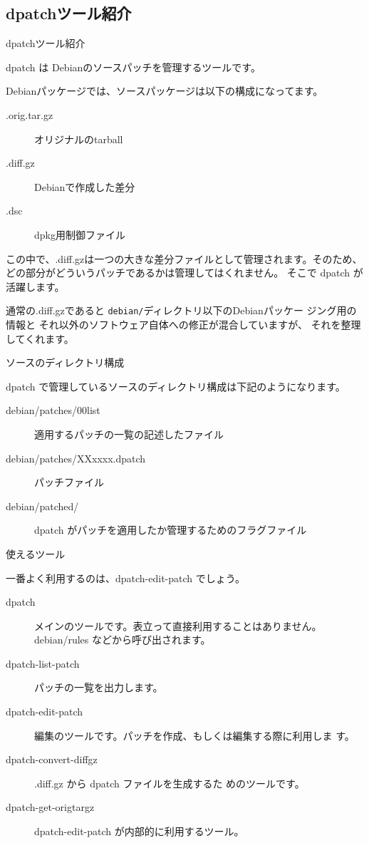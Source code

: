 \documentclass[cjk,dvipdfmx]{beamer}
\begin{document}
\subsection{dpatchツール紹介}
\begin{frame}{dpatchツール紹介}

dpatch は Debianのソースパッチを管理するツールです。

Debianパッケージでは、ソースパッケージは以下の構成になってます。
\begin{description}
    \item[.orig.tar.gz] オリジナルのtarball
    \item[.diff.gz] Debianで作成した差分
    \item[.dsc] dpkg用制御ファイル
\end{description}

この中で、.diff.gzは一つの大きな差分ファイルとして管理されます。そのため、
どの部分がどういうパッチであるかは管理してはくれません。
そこで dpatch が活躍します。

通常の.diff.gzであると \texttt{debian/}ディレクトリ以下のDebianパッケー
ジング用の情報と それ以外のソフトウェア自体への修正が混合していますが、
それを整理してくれます。

\end{frame}

\begin{frame}{ソースのディレクトリ構成}

dpatch で管理しているソースのディレクトリ構成は下記のようになります。
 
\begin{description}
 \item[debian/patches/00list] 適用するパッチの一覧の記述したファイル
 \item[debian/patches/XXxxxx.dpatch] パッチファイル
 \item[debian/patched/] dpatch がパッチを適用したか管理するためのフラグファイル
\end{description}

\end{frame}

\begin{frame}
{使えるツール} 

一番よく利用するのは、dpatch-edit-patch でしょう。

\begin{description}
 \item[dpatch] メインのツールです。表立って直接利用することはありません。
	    debian/rules などから呼び出されます。
 \item[dpatch-list-patch] パッチの一覧を出力します。
 \item[dpatch-edit-patch] 編集のツールです。パッチを作成、もしくは編集する際に利用しま
	    す。
 \item[dpatch-convert-diffgz] .diff.gz から dpatch ファイルを生成するた
	    めのツールです。
 \item[dpatch-get-origtargz] dpatch-edit-patch が内部的に利用するツール。
\end{description}
\end{frame}
\end{document}
